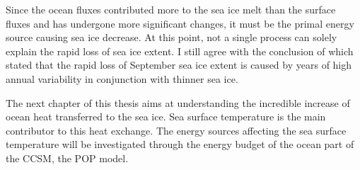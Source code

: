 Since the ocean fluxes contributed more to the sea ice melt than the surface fluxes and has undergone more significant changes, it must be the primal energy source causing sea ice decrease. At this point, not a single process can solely explain the rapid loss of sea ice extent. I still agree with the conclusion of \cite{ISI:000242942100008} which stated that the rapid loss of September sea ice extent is caused by years of high annual variability in conjunction with thinner sea ice. 


The next chapter of this thesis aims at understanding the incredible increase of ocean heat transferred to the sea ice. Sea surface temperature is the main contributor to this heat exchange. The energy sources affecting the sea surface temperature will be investigated through the energy budget of the ocean part of the CCSM, the POP model.









